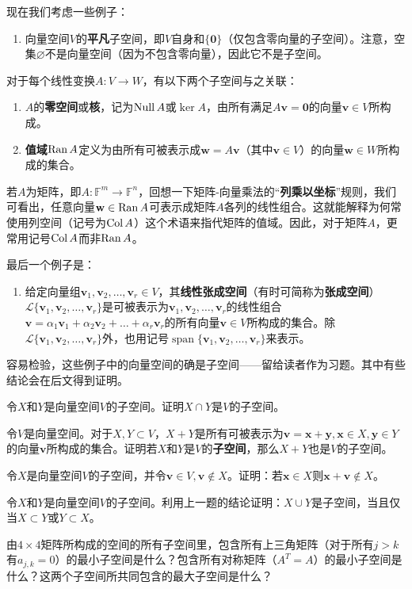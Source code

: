 现在我们考虑一些例子：
\begin{enumerate}
    \item 向量空间$V$的{\bf 平凡}子空间，即$V$自身和$\{\mathbf{0}\}$（仅包含零向量的子空间）。注意，空集$\varnothing$不是向量空间（因为不包含零向量），因此它不是子空间。
\end{enumerate}
对于每个线性变换$A:V\to W$，有以下两个子空间与之关联：
\begin{enumerate}[start=2]
    \item $A$的{\bf 零空间}或{\bf 核}，记为$\operatorname{Null} A$或$\ker A$，由所有满足$A\mathbf{v}=\mathbf{0}$的向量$\mathbf{v}\in V$所构成。
    \item \textbf{值域}$\operatorname{Ran} A$定义为由所有可被表示成$\mathbf{w}=A\mathbf{v}$（其中$\mathbf{v}\in V$）的向量$\mathbf{w}\in W$所构成的集合。
\end{enumerate}
若$A$为矩阵，即$A:\mathbb{F}^m\to\mathbb{F}^n$，回想一下矩阵-向量乘法的“{\bf 列乘以坐标}”规则，我们可看出，任意向量$\mathbf{w}\in \operatorname{Ran} A$可表示成矩阵$A$各列的线性组合。这就能解释为何常使用列空间（记号为$\operatorname{Col} A$）这个术语来指代矩阵的值域。因此，对于矩阵$A$，更常用记号$\operatorname{Col} A$而非$\operatorname{Ran} A$。

最后一个例子是：
\begin{enumerate}[start=4]
    \item 给定向量组$\mathbf{v}_{1},\mathbf{v}_{2},\ldots,\mathbf{v}_{r}\in V$，其{\bf 线性张成空间}（有时可简称为{\bf 张成空间}）$\mathcal{L}\{\mathbf{v}_{1},\mathbf{v}_{2},\ldots,\mathbf{v}_{r}\}$是可被表示为$\mathbf{v}_{1},\mathbf{v}_{2},\ldots,\mathbf{v}_{r}$的线性组合$\mathbf{v}=\alpha_{1}\mathbf{v}_{1}+\alpha_{2}\mathbf{v}_{2}+\ldots+\alpha_{r}\mathbf{v}_{r}$的所有向量$\mathbf{v}\in V$所构成的集合。除$\mathcal{L}\{\mathbf{v}_{1},\mathbf{v}_{2},\ldots,\mathbf{v}_{r}\}$外，也用记号$\operatorname{span}\{\mathbf{v}_{1},\mathbf{v}_{2},\ldots,\mathbf{v}_{r}\}$来表示。
\end{enumerate}
容易检验，这些例子中的向量空间的确是子空间——留给读者作为习题。其中有些结论会在后文得到证明。

\begin{problemset}
    \item 令$X$和$Y$是向量空间$V$的子空间。证明$X\cap Y$是$V$的子空间。
    \item 令$V$是向量空间。对于$X,Y\subset V$，$X+Y$是所有可被表示为$\mathbf{v}=\mathbf{x}+\mathbf{y},\mathbf{x}\in X,\mathbf{y}\in Y$的向量$\mathbf{v}$所构成的集合。证明若$X$和$Y$是$V$的{\bf 子空间}，那么$X+Y$也是$V$的子空间。
    \item 令$X$是向量空间$V$的子空间，并令$\mathbf{v}\in V,\mathbf{v}\notin X$。证明：若$\mathbf{x}\in X$则$\mathbf{x}+\mathbf{v}\not\in X$。
    \item 令$X$和$Y$是向量空间$V$的子空间。利用上一题的结论证明：$X\cup Y$是子空间，当且仅当$X\subset Y$或$Y\subset X$。
    \item 由$4\times 4$矩阵所构成的空间的所有子空间里，包含所有上三角矩阵（对于所有$j>k$有$a_{j,k}=0$）的最小子空间是什么？包含所有对称矩阵（$A^T=A$）的最小子空间是什么？这两个子空间所共同包含的最大子空间是什么？
\end{problemset}


